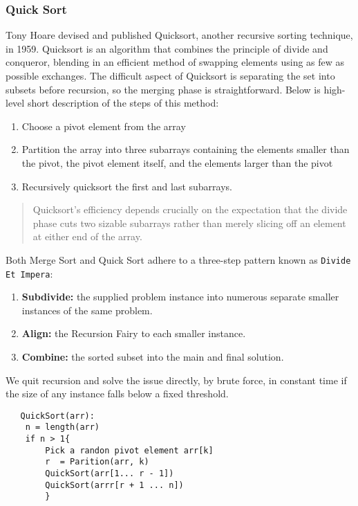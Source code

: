 \documentclass[11pt, letter paper]{article}
\begin{document}
         \subsubsection{Quick Sort}
         Tony Hoare devised and published Quicksort, another recursive sorting technique, in 1959. Quicksort is an algorithm that combines the principle of divide and conqueror, blending in an efficient method of swapping elements using as few as possible exchanges.
         The difficult aspect of Quicksort is separating the set into subsets before recursion, so the merging phase is straightforward. Below is high-level short description of the steps of this method:
         \begin{enumerate}
             \item Choose a pivot element from the array
             \item Partition the array into three subarrays containing the elements smaller than the pivot, the pivot element itself, and the elements larger than the pivot
             \item Recursively quicksort the first and last subarrays.
         \end{enumerate}

        \begin{quote}
            \cite{Niev} Quicksort's efficiency depends crucially on the expectation that the divide phase cuts two sizable subarrays rather than merely slicing off an element at either end of the array.
        \end{quote}

        Both Merge Sort and Quick Sort adhere to a three-step pattern known as \texttt{Divide Et Impera}:
            \begin{enumerate}
                \item \textbf{Subdivide:} the supplied problem instance into numerous separate smaller instances of the same problem.
                \item \textbf{Align:} the Recursion Fairy to each smaller instance.
                \item \textbf{Combine:} the sorted subset into the main and final solution.
            \end{enumerate}
        We quit recursion and solve the issue directly, by brute force, in constant time if the size of any instance falls below a fixed threshold.

        \begin{lstlisting}
   QuickSort(arr):
	n = length(arr)
	if n > 1{
		Pick a randon pivot element arr[k]
		r  = Parition(arr, k)
		QuickSort(arr[1... r - 1])
		QuickSort(arrr[r + 1 ... n])
        }
        \end{lstlisting}
\end{document}
